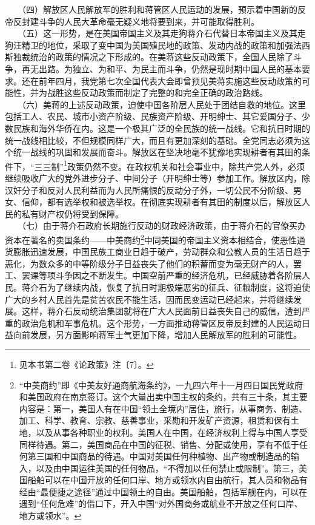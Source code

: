 \documentclass[cn,11pt,chinese]{elegantbook}
\begin{document}
　　（四）解放区人民解放军的胜利和蒋管区人民运动的发展，预示着中国新的反帝反封建斗争的人民大革命毫无疑义地将要到来，并可能取得胜利。\\
　　（五）这一形势，是在美国帝国主义及其走狗蒋介石代替日本帝国主义及其走狗汪精卫的地位，采取了变中国为美国殖民地的政策、发动内战的政策和加强法西斯独裁统治的政策的情况之下形成的。在美蒋这些反动政策下，全国人民除了斗争，再无出路。为独立、为和平、为民主而斗争，仍然是现时期中国人民的基本要求。还在前年四月，我党第七次全国代表大会即曾预见美蒋实施这些反动政策的可能性，并为战胜这些反动政策而制定了完整的和完全正确的政治路线。\\
　　（六）美蒋的上述反动政策，迫使中国各阶层人民处于团结自救的地位。这里包括工人、农民、城市小资产阶级、民族资产阶级、开明绅士、其它爱国分子、少数民族和海外华侨在内。这是一个极其广泛的全民族的统一战线。它和抗日时期的统一战线相比较，不但规模同样广大，而且有更加深刻的基础。全党同志必须为这个统一战线的巩固和发展而奋斗。解放区在坚决地毫不犹豫地实现耕者有其田的条件下，“三三制”\footnote[4]{ 见本书第二卷《论政策》注〔7〕。}政策仍然不变。在政权机关和社会事业中，除共产党人外，必须继续吸收广大的党外进步分子、中间分子（开明绅士等）参加工作。解放区内，除汉奸分子和反对人民利益而为人民所痛恨的反动分子外，一切公民不分阶级、男女、信仰，都有选举权和被选举权。在彻底实现耕者有其田的制度以后，解放区人民的私有财产权仍将受到保障。\\
　　（七）由于蒋介石政府长期施行反动的财政经济政策，由于蒋介石的官僚买办资本在著名的卖国条约——中美商约\footnote[5]{ “中美商约”即《中美友好通商航海条约》，一九四六年十一月四日国民党政府和美国政府在南京签订。这个大量出卖中国主权的条约，共有三十条，其主要内容是：第一，美国人有在中国“领土全境内”居住，旅行，从事商务、制造、加工、科学、教育、宗教、慈善事业，采勘和开发矿产资源，租赁和保有土地，以及从事各种职业的权利。美国人在中国，在经济权利上得与中国人享受同样待遇。第二，美国商品在中国的征税、销售、分配或使用，享有不低于任何第三国和中国商品的待遇。中国对美国任何种植物、出产物或制造品的输入，以及由中国运往美国的任何物品，“不得加以任何禁止或限制”。第三，美国船舶可以在中国开放的任何口岸、地方或领水内自由航行，其人员和物品有经由“最便捷之途径”通过中国领土的自由。美国船舶，包括军舰在内，可以在遇到“任何危难”的借口下，开入中国“对外国商务或航业不开放之任何口岸、地方或领水”。}中同美国的帝国主义资本相结合，使恶性通货膨胀迅速发展，中国民族工商业日趋于破产，劳动群众和公教人员的生活日趋于恶化，为数众多的中等阶级分子日益丧失了他们的积蓄而变为毫无财产的人，罢工、罢课等项斗争因之不断发生。中国空前严重的经济危机，已经威胁着各阶层人民。蒋介石为了继续内战，恢复了抗日时期极端恶劣的征兵、征粮制度，这将迫使广大的乡村人民首先是贫苦农民不能生活，因而民变运动已经起来，并将继续发展。这样，蒋介石反动统治集团就将在广大人民面前日益丧失自己的威信，遭到严重的政治危机和军事危机。这个形势，一方面推动蒋管区反帝反封建的人民运动日益向前发展，另方面影响蒋军士气更加下降，增加人民解放军的胜利的可能性。\\
\end{document}

